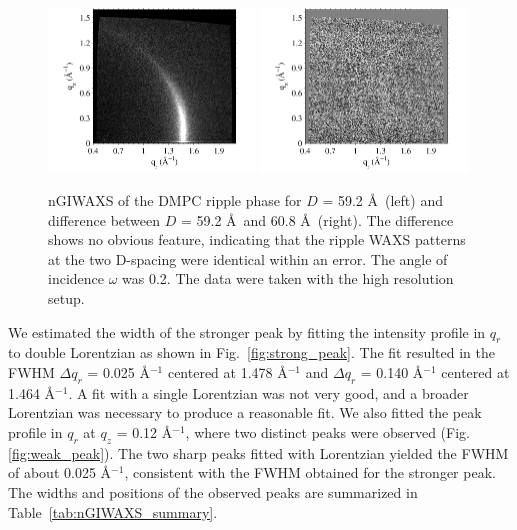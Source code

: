 \begin{figure}[htbp]
  \centering
  \includegraphics[width=0.49\textwidth]{figures/ripple/nGIWAXS/dmpc1_046}
  \includegraphics[width=0.49\textwidth]{figures/ripple/nGIWAXS/046_vs_052}
  \caption{nGIWAXS of the DMPC ripple phase for $D$ = 59.2 \AA\ (left)
  and difference between $D$ = 59.2 \AA\ and 60.8 \AA\ (right). 
  The difference shows no obvious feature, indicating that the ripple WAXS
  patterns at the two D-spacing were identical within an error.
  The angle of incidence $\omega$ was 0.2\textdegree. The data were taken
  with the high resolution setup.}
  \label{fig:nGIWAXS}
\end{figure}

We estimated the width of the stronger peak by fitting 
the intensity profile in $q_r$ to double Lorentzian as shown in 
Fig.~\ref{fig:strong_peak}. The fit resulted in the FWHM $\Delta q_r$
= 0.025 \AA$^{-1}$ centered at 1.478 \AA$^{-1}$ and 
$\Delta q_r$ = 0.140 \AA$^{-1}$ centered at 1.464 \AA$^{-1}$.
A fit with a single Lorentzian was not very good, and 
a broader Lorentzian was necessary to produce a reasonable fit. 
We also fitted the peak profile in $q_r$ at $q_z$ = 0.12 \AA$^{-1}$,
where two distinct peaks were observed (Fig.\ref{fig:weak_peak}).
The two sharp peaks fitted with Lorentzian yielded the FWHM of about 
0.025 \AA$^{-1}$, consistent with the FWHM obtained for the stronger 
peak. The widths and positions of the observed peaks are summarized
in Table~\ref{tab:nGIWAXS_summary}.

